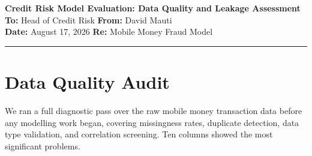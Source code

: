 \documentclass[11pt,a4paper]{article}
\begin{document}
\begin{center}
  {\large\bfseries Credit Risk Model Evaluation: Data Quality and Leakage Assessment}\\[4pt]
  {\small
    \textbf{To:} Head of Credit Risk \quad
    \textbf{From:} David Mauti\\
    \textbf{Date:} August 17, 2026 \quad
    \textbf{Re:} Mobile Money Fraud Model
  }
\end{center}

\vspace{4pt}\hrule\vspace{8pt}

\section{Data Quality Audit}

We ran a full diagnostic pass over the raw mobile money transaction data before any
modelling work began, covering missingness rates, duplicate detection, data type
validation, and correlation screening. Ten columns showed the most significant problems.
\end{document}
